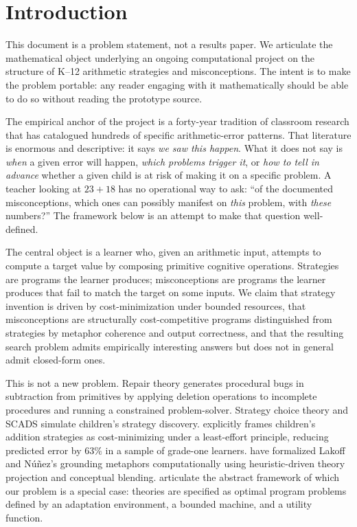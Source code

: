 \documentclass[11pt]{article}
\begin{document}
\section{Introduction}

This document is a problem statement, not a results paper. We
articulate the mathematical object underlying an ongoing computational
project on the structure of K--12 arithmetic strategies and
misconceptions. The intent is to make the problem portable: any reader
engaging with it mathematically should be able to do so without reading
the prototype source.

The empirical anchor of the project is a forty-year tradition of
classroom research that has catalogued hundreds of specific
arithmetic-error patterns. That literature is enormous and
descriptive: it says \emph{we saw this happen}. What it does not say
is \emph{when} a given error will happen, \emph{which problems
trigger it}, or \emph{how to tell in advance} whether a given child is
at risk of making it on a specific problem. A teacher looking at
$23 + 18$ has no operational way to ask: ``of the documented
misconceptions, which ones can possibly manifest on \emph{this}
problem, with \emph{these} numbers?'' The framework below is an
attempt to make that question well-defined.

The central object is a learner who, given an arithmetic input,
attempts to compute a target value by composing primitive cognitive
operations. Strategies are programs the learner produces;
misconceptions are programs the learner produces that fail to match
the target on some inputs. We claim that strategy invention is driven
by cost-minimization under bounded resources, that misconceptions are
structurally cost-competitive programs distinguished from strategies
by metaphor coherence and output correctness, and that the resulting
search problem admits empirically interesting answers but does not in
general admit closed-form ones.

This is not a new problem. Repair theory \parencite{brownvanlehn1980,
vanlehn1990} generates procedural bugs in subtraction from primitives
by applying deletion operations to incomplete procedures and running a
constrained problem-solver. Strategy choice theory and SCADS
\parencite{siegler1988, shragerSiegler1998} simulate children's
strategy discovery. \textcite{young2000} explicitly frames children's
addition strategies as cost-minimizing under a least-effort principle,
reducing predicted error by $63\%$ in a sample of grade-one learners.
\textcite{guhe2011blending, guhe2009commutativity} have formalized
Lakoff and N\'u\~nez's grounding metaphors computationally using
heuristic-driven theory projection and conceptual blending.
\textcite{lewis2014} articulate the abstract framework of which our
problem is a special case: theories are specified as optimal program
problems defined by an adaptation environment, a bounded machine, and
a utility function.
\end{document}
